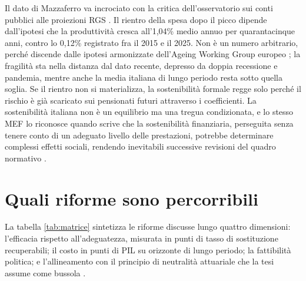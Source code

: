 \medskip
\noindent
Il dato di Mazzaferro va incrociato con la critica dell'osservatorio sui conti
pubblici alle proiezioni RGS \cite{OCPI2026}. Il rientro della spesa dopo il picco
dipende dall'ipotesi che la produttività cresca all'1,04\% medio annuo per
quarantacinque anni, contro lo 0,12\% registrato fra il 2015 e il 2025. Non è un
numero arbitrario, perché discende dalle ipotesi armonizzate dell'Ageing Working
Group europeo \cite{MEF_RGS2025}; la fragilità sta nella distanza dal dato recente,
depresso da doppia recessione e pandemia, mentre anche la media italiana di lungo
periodo resta sotto quella soglia. Se il rientro non si materializza, la
sostenibilità formale regge solo perché il rischio è già scaricato sui pensionati
futuri attraverso i coefficienti. La sostenibilità italiana non è un equilibrio ma
una tregua condizionata, e lo stesso MEF lo riconosce quando scrive che
\guillemotleft{}la sostenibilità finanziaria, perseguita senza tenere conto di un
adeguato livello delle prestazioni, potrebbe determinare complessi effetti sociali,
rendendo inevitabili successive revisioni del quadro normativo \guillemotright{}
\cite{MEF_RGS2025}.

\section{Quali riforme sono percorribili}
\label{sec:matrice}

\noindent
La tabella \ref{tab:matrice} sintetizza le riforme discusse lungo quattro
dimensioni: l'efficacia rispetto all'adeguatezza, misurata in punti di tasso di
sostituzione recuperabili; il costo in punti di PIL su orizzonte di lungo
periodo; la fattibilità politica; e l'allineamento con il principio di
neutralità attuariale che la tesi assume come bussola \cite{FrancoTommasino2020,
Gronchi2024}.

